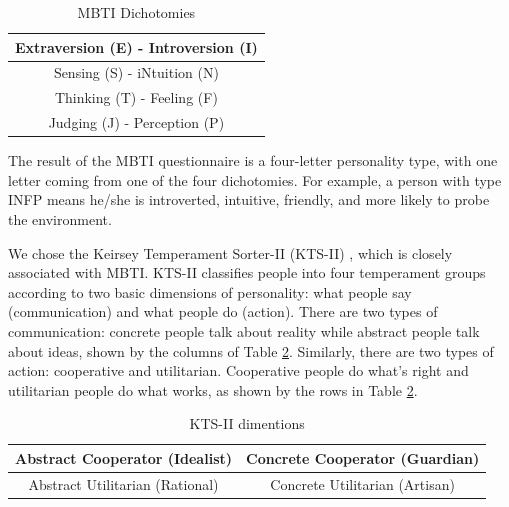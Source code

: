 \begin{table}[!t]
\caption{MBTI Dichotomies}
\label{dich}
\centering
\begin{tabular}{|c|}
\hline
Extraversion (E) - Introversion (I)\\ \hline
Sensing (S) - iNtuition (N)\\ \hline
Thinking (T) - Feeling (F)\\ \hline
Judging (J) - Perception (P)\\ \hline
\end{tabular}
\end{table}

The result of the MBTI questionnaire is a four-letter personality type, with one letter coming from one of the four dichotomies. For example, a person with type INFP means he/she is introverted, intuitive, friendly, and more likely to probe the environment. 

We chose the Keirsey Temperament Sorter-II (KTS-II) \cite{keirsey1998please}, which is closely associated with MBTI. KTS-II classifies people into four temperament groups according to two basic dimensions of personality: what people say (communication) and what people do (action). There are two types of communication: concrete people talk about reality while abstract people talk about ideas, shown by the columns of Table \ref{kts}. Similarly, there are two types of action: cooperative and utilitarian. Cooperative people do what's right and utilitarian people do what works, as shown by the rows in Table \ref{kts}.    

\begin{table}[!t]
\caption{KTS-II dimentions}
\label{kts}
\centering
\begin{tabular}{|c|c|}
\hline
Abstract Cooperator (Idealist)& Concrete Cooperator (Guardian)\\ \hline
Abstract Utilitarian (Rational)& Concrete Utilitarian (Artisan)\\ \hline
\end{tabular}
\end{table}

